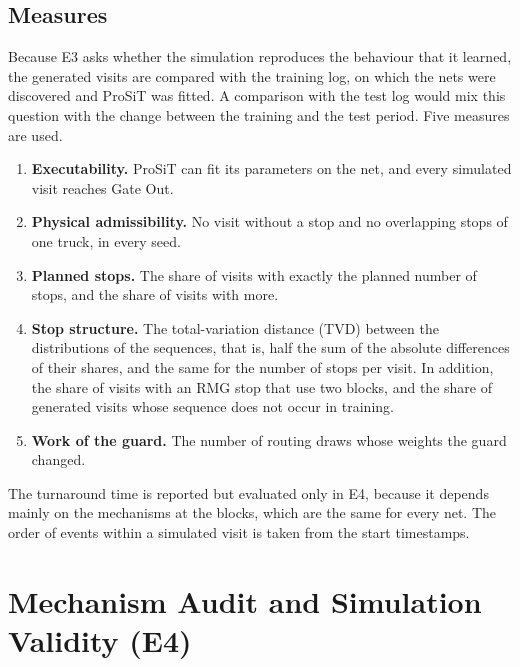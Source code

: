 \subsection{Measures}
\label{sec:exp_e3_measures}
Because E3 asks whether the simulation reproduces the behaviour that it learned, the
generated visits are compared with the training log, on which the nets were
discovered and ProSiT was fitted. A comparison with the test log would mix this
question with the change between the training and the test period. Five measures
are used.
\begin{enumerate}
\item \textbf{Executability.} ProSiT can fit its parameters on the net, and every
simulated visit reaches Gate Out.
\item \textbf{Physical admissibility.} No visit without a stop and no overlapping
stops of one truck, in every seed.
\item \textbf{Planned stops.} The share of visits with exactly the planned number
of stops, and the share of visits with more.
\item \textbf{Stop structure.} The total-variation distance (TVD) between the
distributions of the sequences, that is, half the sum of the absolute differences
of their shares, and the same for the number of stops per visit. In addition, the
share of visits with an RMG stop that use two blocks, and the share of generated
visits whose sequence does not occur in training.
\item \textbf{Work of the guard.} The number of routing draws whose weights the
guard changed.
\end{enumerate}
The turnaround time is reported but evaluated only in E4, because it depends mainly on
the mechanisms at the blocks, which are the same for every net. The order of events
within a simulated visit is taken from the start timestamps.

\section{Mechanism Audit and Simulation Validity (E4)}
\label{sec:exp_mechanisms}
\label{sec:exp_e4_design}


